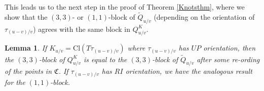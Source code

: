 \documentclass[11pt]{amsart}
\theoremstyle{plain}
\newtheorem{lemmaN}[theoremN]{Lemma}
\theoremstyle{definition}
\theoremstyle{remark}
\begin{document}

This leads us to the next step in the proof of Theorem \ref{Knotsthm}, where we show that the $(3,3)$- or $(1,1)$-block of $\widetilde{Q}_{u/v}$ (depending on the orientation of $\tau_{(u-v)/v}$) agrees with the same block in $Q_{u/v}^K$.

\begin{lemmaN}
\label{Qmmagree}
   If $K_{u/v}=\text{Cl}(T\tau_{(u-v)/v})$ where $\tau_{(u-v)/v}$ has $UP$ orientation, then the $(3,3)$-block of $Q_{u/v}^K$ is equal to the $(3,3)$-block of $\widetilde{Q}_{u/v}$ after some re-ording of the points in $\mathfrak{C}$. If $\tau_{(u-v)/v}$ has $RI$ orientation, we have the analogous result for the $(1,1)$-block.
\end{lemmaN}
\end{document}
